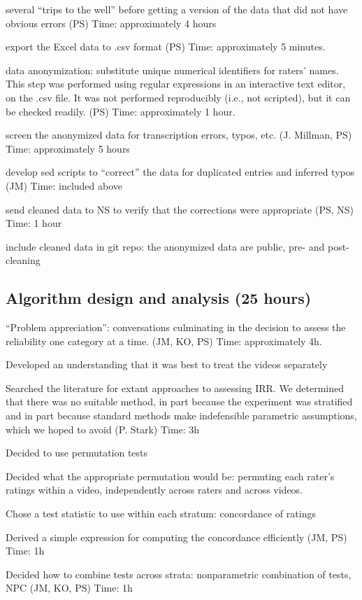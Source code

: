 \documentclass[]{article}
\begin{document}
several ``trips to the well'' before getting a version of the data
that did not have obvious errors (PS) Time: approximately 4
hours

export the Excel data to .csv format (PS) Time: approximately
5 minutes.

data anonymization: substitute unique numerical identifiers for
raters' names. This step was performed using regular expressions in
an interactive text editor, on the .csv file. It was not performed
reproducibly (i.e., not scripted), but it can be checked readily.
(PS) Time: approximately 1 hour.

screen the anonymized data for transcription errors, typos, etc. (J.
Millman, PS) Time: approximately 5 hours

develop sed scripts to ``correct'' the data for duplicated entries
and inferred typos (JM) Time: included above

send cleaned data to NS to verify that the corrections were
appropriate (PS, NS) Time: 1 hour

include cleaned data in git repo: the anonymized data are public,
pre- and post-cleaning
  
\subsection{Algorithm design and analysis (25 hours)}


``Problem appreciation'': conversations culminating in the decision
to assess the reliability one category at a time. (JM, KO, PS)
Time: approximately 4h.

Developed an understanding that it was best to treat the videos
separately

Searched the literature for extant approaches to assessing IRR. We
determined that there was no suitable method, in part because the
experiment was stratified and in part because standard methods make
indefensible parametric assumptions, which we hoped to avoid (P.
Stark) Time: 3h

Decided to use permutation tests

Decided what the appropriate permutation would be: permuting each
rater's ratings within a video, independently across raters and
across videos.

Chose a test statistic to use within each stratum: concordance of
ratings

Derived a simple expression for computing the concordance
efficiently (JM, PS) Time: 1h

Decided how to combine tests across strata: nonparametric
combination of tests, NPC (JM, KO, PS) Time:
1h
\end{document}
